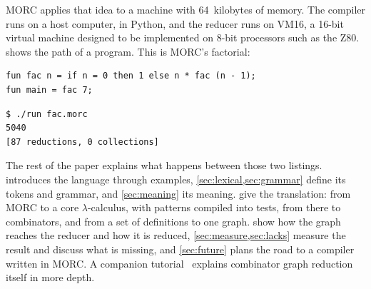 \documentclass[11pt,a4paper]{article}
\theoremstyle{definition}
\theoremstyle{plain}
\begin{document}
MORC applies that idea to a machine with 64~kilobytes of memory. The
compiler runs on a host computer, in Python, and the reducer runs on
VM16, a 16-bit virtual machine designed to be implemented on 8-bit
processors such as the Z80.  shows the path of a program.
This is MORC's factorial:
\begin{lstlisting}[style=morc]
fun fac n = if n = 0 then 1 else n * fac (n - 1);
fun main = fac 7;
\end{lstlisting}
\begin{lstlisting}[style=plain]
$ ./run fac.morc
5040
[87 reductions, 0 collections]
\end{lstlisting}
The rest of the paper explains what happens between those two listings.
 introduces the language through examples,
\cref{sec:lexical,sec:grammar} define its tokens and grammar, and
\cref{sec:meaning} its meaning. 
give the translation: from MORC to a core $\lambda$-calculus, with patterns
compiled into tests, from there to combinators, and from a set of
definitions to one graph.
 show how the graph reaches the reducer and
how it is reduced, \cref{sec:measure,sec:lacks} measure the result and
discuss what is missing, and \cref{sec:future} plans the road to a compiler
written in MORC. A companion tutorial~\cite{graphtut} explains
combinator graph reduction itself in more depth.
\end{document}
